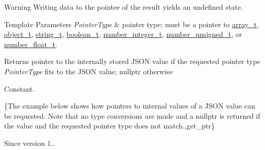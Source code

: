 \begin{DoxyWarning}{Warning}
Writing data to the pointee of the result yields an undefined state.
\end{DoxyWarning}

\begin{DoxyTemplParams}{Template Parameters}
{\em Pointer\+Type} & pointer type; must be a pointer to \hyperlink{a00025_ab00b882d39306d663c23dab110f5cae0}{array\+\_\+t}, \hyperlink{a00025_a0ac9894c9de8dc551cf2e5f1c605537f}{object\+\_\+t}, \hyperlink{a00025_ab63e618bbb0371042b1bec17f5891f42}{string\+\_\+t}, \hyperlink{a00025_af3bc3e83aa162d7ba4df16a949872723}{boolean\+\_\+t}, \hyperlink{a00025_ac4b10b2364f26ce47bdb9a413ff04a59}{number\+\_\+integer\+\_\+t}, \hyperlink{a00025_a60a04166c122072ab11eaf9845d9cd1d}{number\+\_\+unsigned\+\_\+t}, or \hyperlink{a00025_a74a0013e847fdc574b48f931f0e757e1}{number\+\_\+float\+\_\+t}.\\
\hline
\end{DoxyTemplParams}
\begin{DoxyReturn}{Returns}
pointer to the internally stored J\+S\+ON value if the requested pointer type {\itshape Pointer\+Type} fits to the J\+S\+ON value; {\ttfamily nullptr} otherwise
\end{DoxyReturn}
Constant.

\{The example below shows how pointers to internal values of a J\+S\+ON value can be requested. Note that no type conversions are made and a {\ttfamily nullptr} is returned if the value and the requested pointer type does not match.,get\+\_\+ptr\}

\begin{DoxySince}{Since}
version 1.. 
\end{DoxySince}
